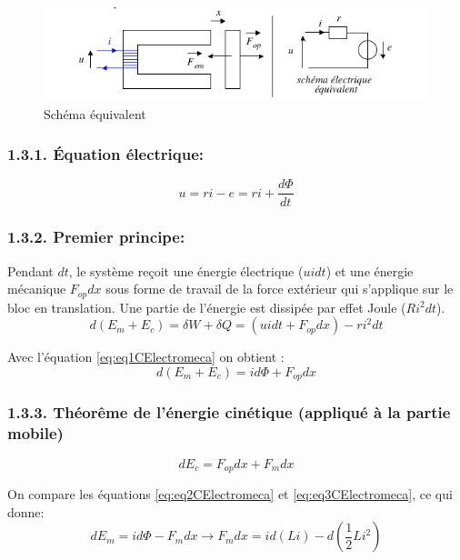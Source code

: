 \documentclass[french, a4paper, 10pt, twocolumn, landscape]{article}
\begin{document}
\begin{figure}[ht]
	\centering
	\includegraphics[width=.5\linewidth]{./figures/ForceElectromagnetique.png}
	\caption{Schéma équivalent}
\end{figure}

\subsubsection*{1.3.1. Équation électrique:}
\begin{equation}
	u = ri -e = ri +\dfrac{d\Phi}{dt} \label{eq:eq1CElectromeca}
\end{equation}

\subsubsection*{1.3.2. Premier principe: }
Pendant $dt$, le système reçoit une énergie électrique ($uidt$) et une énergie mécanique $F_{op}dx$ sous forme de travail de la force extérieur qui s'applique sur le bloc en translation. Une partie de l'énergie est dissipée par effet Joule ($Ri^2dt$).
\begin{equation}
	d(E_m+E_c) = \delta W + \delta Q = (uidt+F_{op}dx)-ri^2dt
\end{equation}

Avec l'équation \eqref{eq:eq1CElectromeca} on obtient : 
\begin{equation}
	d(E_m+E_c) = id \Phi+F_{op}dx \label{eq:eq2CElectromeca}
\end{equation}

\subsubsection*{1.3.3. Théorême de l'énergie cinétique (appliqué à la partie mobile)}
\begin{equation}
	dE_c=F_{op}dx+F_{m}dx \label{eq:eq3CElectromeca}
\end{equation}

On compare les équations \eqref{eq:eq2CElectromeca} et \eqref{eq:eq3CElectromeca}, ce qui donne: 
\begin{equation}
	dE_m = id\Phi-F_{m}dx \rightarrow F_{m}dx = id(Li)-d(\dfrac{1}{2}Li^2) \label{eq:eq4CElectromeca}
\end{equation}
\end{document}
